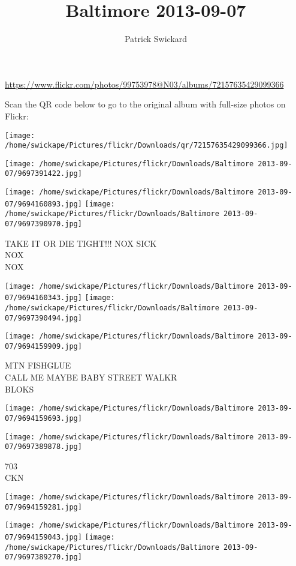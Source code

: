 \documentclass[10pt,letterpaper]{article}
\title{Baltimore 2013-09-07}
\author{Patrick Swickard}
\date{}
\begin{document}
\maketitle

\url{https://www.flickr.com/photos/99753978@N03/albums/72157635429099366}

Scan the QR code below to go to the original album with full-size photos on Flickr:

\texttt{[image: /home/swickape/Pictures/flickr/Downloads/qr/72157635429099366.jpg]}
\pagebreak

\texttt{[image: /home/swickape/Pictures/flickr/Downloads/Baltimore 2013-09-07/9697391422.jpg]}

\vspace{0.25in}
\texttt{[image: /home/swickape/Pictures/flickr/Downloads/Baltimore 2013-09-07/9694160893.jpg]}
\texttt{[image: /home/swickape/Pictures/flickr/Downloads/Baltimore 2013-09-07/9697390970.jpg]}

TAKE IT OR DIE TIGHT!!! NOX SICK\\
NOX\\
NOX
\pagebreak

\texttt{[image: /home/swickape/Pictures/flickr/Downloads/Baltimore 2013-09-07/9694160343.jpg]}
\texttt{[image: /home/swickape/Pictures/flickr/Downloads/Baltimore 2013-09-07/9697390494.jpg]}

\vspace{0.25in}
\texttt{[image: /home/swickape/Pictures/flickr/Downloads/Baltimore 2013-09-07/9694159909.jpg]}

MTN FISHGLUE\\
CALL ME MAYBE BABY STREET WALKR\\
BLOKS
\pagebreak

\texttt{[image: /home/swickape/Pictures/flickr/Downloads/Baltimore 2013-09-07/9694159693.jpg]}

\vspace{0.25in}
\texttt{[image: /home/swickape/Pictures/flickr/Downloads/Baltimore 2013-09-07/9697389878.jpg]}

703\\
CKN
\pagebreak

\texttt{[image: /home/swickape/Pictures/flickr/Downloads/Baltimore 2013-09-07/9694159281.jpg]}

\vspace{0.25in}
\texttt{[image: /home/swickape/Pictures/flickr/Downloads/Baltimore 2013-09-07/9694159043.jpg]}
\texttt{[image: /home/swickape/Pictures/flickr/Downloads/Baltimore 2013-09-07/9697389270.jpg]}
\end{document}
